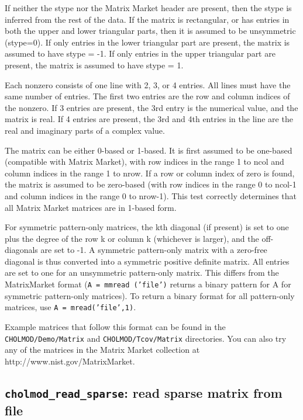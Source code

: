 \documentclass[11pt]{article}
\begin{document}
If neither the stype nor the Matrix Market header are present, then
the stype is inferred from the rest of the data.  If the matrix is
rectangular, or has
entries in both the upper and lower triangular parts, then it is assumed to
be unsymmetric (stype=0).  If only entries in the lower triangular part are
present, the matrix is assumed to have stype = -1.  If only entries in the
upper triangular part are present, the matrix is assumed to have stype = 1.

Each nonzero consists of one line with 2, 3, or 4 entries.  All lines must
have the same number of entries.  The first two entries are the row and
column indices of the nonzero.  If 3 entries are present, the 3rd entry is
the numerical value, and the matrix is real.  If 4 entries are present,
the 3rd and 4th entries in the line are the real and imaginary parts of
a complex value.

The matrix can be either 0-based or 1-based.  It is first assumed to be
one-based (compatible with Matrix Market), with row indices in the range
1 to ncol and column indices in the range 1 to nrow.  If a row or column
index of zero is found, the matrix is assumed to be zero-based (with row
indices in the range 0 to ncol-1 and column indices in the range 0 to
nrow-1).  This test correctly determines that all Matrix Market
matrices are in 1-based form.

For symmetric pattern-only matrices, the kth diagonal (if present) is set to
one plus the degree of the row k or column k (whichever is larger), and the
off-diagonals are set to -1.  A symmetric pattern-only matrix with a
zero-free diagonal is thus converted into a symmetric positive definite
matrix.  All entries are set to one for an unsymmetric pattern-only matrix.
This differs from the MatrixMarket format ({\tt A = mmread ('file')} returns
a binary pattern for A for symmetric pattern-only matrices).
To return a binary format for all pattern-only matrices, use
{\tt A = mread('file',1)}.

Example matrices that follow this format can be found in the
{\tt CHOLMOD/Demo/Matrix} and \newline
{\tt CHOLMOD/Tcov/Matrix} directories.
You can also try any of the matrices in the Matrix Market collection
at http://www.nist.gov/MatrixMarket.

\subsection{{\tt cholmod\_read\_sparse}: read sparse matrix from file}
\end{document}
